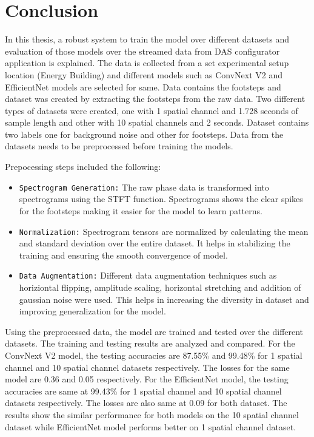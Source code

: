 \chapter{Conclusion}

In this thesis, a robust system to train the model over different datasets and evaluation of those models over the streamed data from DAS configurator application is explained. The data is collected from a set experimental setup location (Energy Building) and different models such as ConvNext V2 and EfficientNet models are selected for same.  Data contains the footsteps and dataset was created by extracting the footsteps from the raw data. Two different types of datasets were created, one with 1 spatial channel and 1.728 seconds of sample length and other with 10 spatial channels and 2 seconds. Dataset contains two labels one for background noise and other for footsteps. Data from the datasets needs to be preprocessed before training the models.

Prepocessing steps included the following:
\begin{itemize}
\item \texttt{Spectrogram Generation:} The raw phase data is transformed into spectrograms using the STFT function. Spectrograms shows the clear spikes for the footsteps making it easier for the model to learn patterns.
\item \texttt{Normalization:} Spectrogram tensors are normalized by calculating the mean and standard deviation over the entire dataset. It helps in stabilizing the training and ensuring the smooth convergence of model.
\item \texttt{Data Augmentation:} Different data augmentation techniques such as horiziontal flipping, amplitude scaling, horizontal stretching and addition of gaussian noise were used. This helps in increasing the diversity in dataset and improving generalization for the model.
\end{itemize}

Using the preprocessed data, the model are trained and tested over the different datasets. The training and testing results are analyzed and compared. For the ConvNext V2 model, the testing accuracies are 87.55\% and 99.48\% for 1 spatial channel and 10 spatial channel datasets respectively. The losses for the same model are 0.36 and 0.05 respectively. For the EfficientNet model, the testing accuracies are same at 99.43\% for 1 spatial channel and 10 spatial channel datasets respectively. The losses are also same at 0.09 for both dataset. The results show the similar performance for both models on the 10 spatial channel dataset while EfficientNet model performs better on 1 spatial channel dataset.

